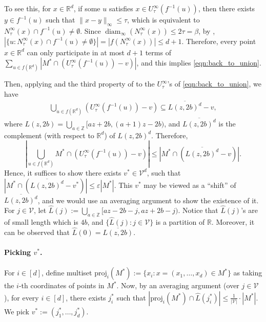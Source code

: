 \documentclass[11pt,letterpaper]{article}
\theoremstyle{plain}
\theoremstyle{definition}
\theoremstyle{remark}
\def\ZZ{{\mathbb{Z}}}
\DeclareMathOperator{\diam}{diam}
\newcommand{\proj}{\ensuremath{\mathrm{proj}}\xspace}
\renewcommand{\epsilon}{\ensuremath{\varepsilon}}
\let\epsilon\varepsilon
\begin{document}
    To see this, for $x \in \mathbb{R}^d$,
    if some $u$ satisfies $x \in U_\tau^\infty(f^{-1}(u))$,
    then there exists $y \in f^{-1}(u)$ such that $\|x - y\|_\infty \leq \tau$,
    which is equivalent to $N_\tau^\infty(x) \cap f^{-1}(u) \neq \emptyset$.
    Since $\diam_\infty(N_\tau^\infty(x)) \leq 2\tau = \beta$,
    by ,
    $ |\{u : N_\tau^\infty(x) \cap f^{-1}(u) \neq \emptyset \}|
    = |f(N_\tau^\infty(x))| \leq d+ 1$.
    Therefore,
    every point $x \in \mathbb{R}^d$ can only participate in at most $ d + 1$ terms of
    $\sum_{u \in f(\mathbb{R}^d)} |M^* \cap (U_\tau^\infty(f^{-1}(u)) - v)|$,
    and this implies \eqref{eqn:back_to_union}.


Then, 
applying  and the third property of  to the $U_\tau^\infty$'s of \eqref{eqn:back_to_union},
we have
\begin{align*}
    \bigcup_{u \in f(\mathbb{R}^d)} (U_\tau^\infty(f^{-1}(u)) - v)
    \subseteq \overline{L(z, 2b)^d} - v,
\end{align*}
where $L(z, 2b) = \bigcup_{a \in \ZZ} [az + 2b, (a + 1)z - 2b)$,
and $\overline{L(z, 2b)^d}$ is the complement (with respect to $\mathbb{R}^d$) of $L(z, 2b)^d$.
Therefore,
\begin{equation}
    \label{eqn:to_shift}
    \left| \bigcup_{u \in f(\mathbb{R}^d)} M^* \cap (U_\tau^\infty(f^{-1}(u)) - v) \right|
    \leq \left| M^* \cap (\overline{L(z, 2b)^d} - v) \right|.
\end{equation}
Hence, it suffices to show there exists $v^* \in \mathcal{V}^d$,
such that $|M^* \cap (\overline{L(z, 2b)^d} - v^*)| \leq \epsilon |M^*|$.
This $v^*$ may be viewed as a ``shift'' of $\overline{L(z, 2b)^d}$,
and we would use an averaging argument to show the existence of it.
For $j \in \mathcal{V}$, let $\hat{L}(j) := \bigcup_{a \in \ZZ}[az - 2b - j, az + 2b - j)$.
Notice that $\hat{L}(j)$'s are of small length which is $4b$,
and $\{ \hat{L}(j) : j \in \mathcal{V} \}$ is a partition of $\mathbb{R}$.
Moreover, it can be observed that $\hat{L}(0) = \overline{L(z, 2b)}$.

\paragraph{Picking $v^*$.}
For $i \in [d]$, define multiset $\proj_i(M^*) := \{ x_i : x = (x_1, \ldots, x_d) \in M^* \}$ as taking the $i$-th coordinates of points in $M^*$.
Now, by an averaging argument (over $j \in \mathcal{V}$),
for every $i \in [d]$, there exists $j_i^*$ such that 
$ |\proj_i(M^*) \cap \hat{L}(j_i^*)| \leq \frac{1}{|\mathcal{V}|} \cdot |M^*| $.
We pick $v^* := (j_1^*, \ldots, j_d^*)$.
\end{document}
